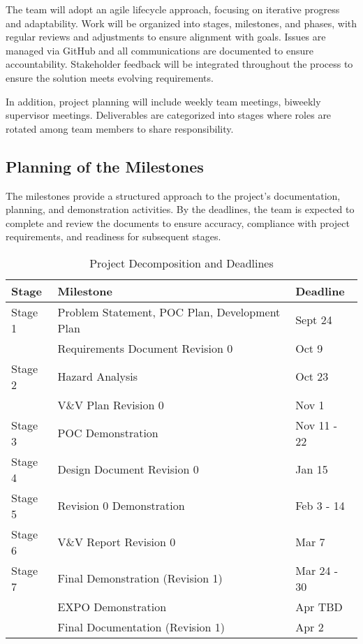 \documentclass[12pt]{article}
\begin{document}
The team will adopt an agile lifecycle approach, focusing on iterative progress
and adaptability. Work will be organized into stages, milestones, and phases,
with regular reviews and adjustments to ensure alignment with goals. Issues are
managed via GitHub and all communications are documented to ensure
accountability. Stakeholder feedback will be integrated throughout the process
to ensure the solution meets evolving requirements.

In addition, project planning will include weekly team meetings, biweekly
supervisor meetings. Deliverables are categorized into stages where roles are
rotated among team members to share responsibility.

\subsection{Planning of the Milestones}

The milestones provide a structured approach to the project's documentation,
planning, and demonstration activities. By the deadlines, the team is expected
to complete and review the documents to ensure accuracy, compliance with project
requirements, and readiness for subsequent stages.

\newpage
\begin{table}[htbp]
  \centering
  \begin{tabular}{|l|l|l|}
  \hline
  \textbf{Stage} & \textbf{Milestone} & \textbf{Deadline} \\
  \hline
  Stage 1 & Problem Statement, POC Plan, Development Plan & Sept 24 \\
  \texttt{} & Requirements Document Revision 0 & Oct 9 \\
  \hline
  Stage 2 & Hazard Analysis & Oct 23 \\
  \texttt{} & V\&V Plan Revision 0 & Nov 1 \\
  \hline
  Stage 3 & POC Demonstration & Nov 11 - 22 \\
  \hline
  Stage 4 & Design Document Revision 0 & Jan 15 \\
  \hline
  Stage 5 & Revision 0 Demonstration & Feb 3 - 14\\
  \hline
  Stage 6 & V\&V Report Revision 0 & Mar 7 \\
  \hline
  Stage 7 & Final Demonstration (Revision 1) & Mar 24 - 30\\
  \texttt{} & EXPO Demonstration & Apr TBD \\
  \texttt{} & Final Documentation (Revision 1) & Apr 2 \\
  \hline
  \end{tabular}
  \caption{Project Decomposition and Deadlines}
  \label{table:2}
\end{table}
\end{document}
